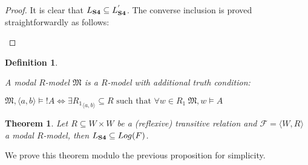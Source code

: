 \documentclass[a4paper]{article}
\theoremstyle{defin}
\newtheorem{defin}{Definition}
\theoremstyle{theorem}
\newtheorem{theorem}{Theorem}
\theoremstyle{prop}
\theoremstyle{lemma}
\theoremstyle{ex}
\theoremstyle{col}
\begin{document}
\begin{proof}
  \item It is clear that $L_{\bf S4} \subseteq L_{\bf S4}^{'}$. The converse inclusion is proved straightforwardly as follows:

\begin{minipage}{0.5\textwidth}
\begin{flushleft}
  \begin{prooftree}
  \end{prooftree}
\end{flushleft}
\end{minipage}\hfill
\begin{minipage}{0.5\textwidth}
\begin{flushright}
  \begin{prooftree}
  \end{prooftree}
\end{flushright}
\end{minipage}
\end{proof}

\begin{defin}

  $ $

  A modal $R$-model $\mathfrak{M}$ is a $R$-model with additional truth condition:

  $\mathfrak{M}, \langle a, b \rangle \models ! A \Leftrightarrow \exists {R_1}_{\langle a, b \rangle} \subseteq R \text{ such that } \forall w \in R_1 \: \mathfrak{M}, w \models A$
\end{defin}

\begin{theorem}
  Let $R \subseteq W \times W$ be a (reflexive) transitive relation and $\mathcal{F} = \langle W, R \rangle$ a modal $R$-model, then $L_{\bf S4} \subseteq Log(F)$.
\end{theorem}

  We prove this theorem modulo the previous proposition for simplicity.
\end{document}
